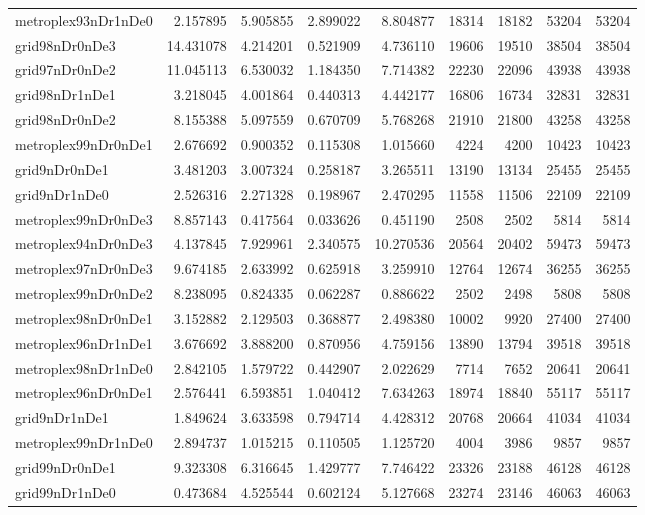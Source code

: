\begin{longtable}{|l|r|r|r|r|r|r|r|r|}
metroplex93nDr1nDe0 & 2.157895 & 5.905855 & 2.899022 & 8.804877 & 18314 & 18182 & 53204 & 53204 \\
grid98nDr0nDe3 & 14.431078 & 4.214201 & 0.521909 & 4.736110 & 19606 & 19510 & 38504 & 38504 \\
grid97nDr0nDe2 & 11.045113 & 6.530032 & 1.184350 & 7.714382 & 22230 & 22096 & 43938 & 43938 \\
grid98nDr1nDe1 & 3.218045 & 4.001864 & 0.440313 & 4.442177 & 16806 & 16734 & 32831 & 32831 \\
grid98nDr0nDe2 & 8.155388 & 5.097559 & 0.670709 & 5.768268 & 21910 & 21800 & 43258 & 43258 \\
metroplex99nDr0nDe1 & 2.676692 & 0.900352 & 0.115308 & 1.015660 & 4224 & 4200 & 10423 & 10423 \\
grid9nDr0nDe1 & 3.481203 & 3.007324 & 0.258187 & 3.265511 & 13190 & 13134 & 25455 & 25455 \\
grid9nDr1nDe0 & 2.526316 & 2.271328 & 0.198967 & 2.470295 & 11558 & 11506 & 22109 & 22109 \\
metroplex99nDr0nDe3 & 8.857143 & 0.417564 & 0.033626 & 0.451190 & 2508 & 2502 & 5814 & 5814 \\
metroplex94nDr0nDe3 & 4.137845 & 7.929961 & 2.340575 & 10.270536 & 20564 & 20402 & 59473 & 59473 \\
metroplex97nDr0nDe3 & 9.674185 & 2.633992 & 0.625918 & 3.259910 & 12764 & 12674 & 36255 & 36255 \\
metroplex99nDr0nDe2 & 8.238095 & 0.824335 & 0.062287 & 0.886622 & 2502 & 2498 & 5808 & 5808 \\
metroplex98nDr0nDe1 & 3.152882 & 2.129503 & 0.368877 & 2.498380 & 10002 & 9920 & 27400 & 27400 \\
metroplex96nDr1nDe1 & 3.676692 & 3.888200 & 0.870956 & 4.759156 & 13890 & 13794 & 39518 & 39518 \\
metroplex98nDr1nDe0 & 2.842105 & 1.579722 & 0.442907 & 2.022629 & 7714 & 7652 & 20641 & 20641 \\
metroplex96nDr0nDe1 & 2.576441 & 6.593851 & 1.040412 & 7.634263 & 18974 & 18840 & 55117 & 55117 \\
grid9nDr1nDe1 & 1.849624 & 3.633598 & 0.794714 & 4.428312 & 20768 & 20664 & 41034 & 41034 \\
metroplex99nDr1nDe0 & 2.894737 & 1.015215 & 0.110505 & 1.125720 & 4004 & 3986 & 9857 & 9857 \\
grid99nDr0nDe1 & 9.323308 & 6.316645 & 1.429777 & 7.746422 & 23326 & 23188 & 46128 & 46128 \\
grid99nDr1nDe0 & 0.473684 & 4.525544 & 0.602124 & 5.127668 & 23274 & 23146 & 46063 & 46063 \\

\end{longtable}
